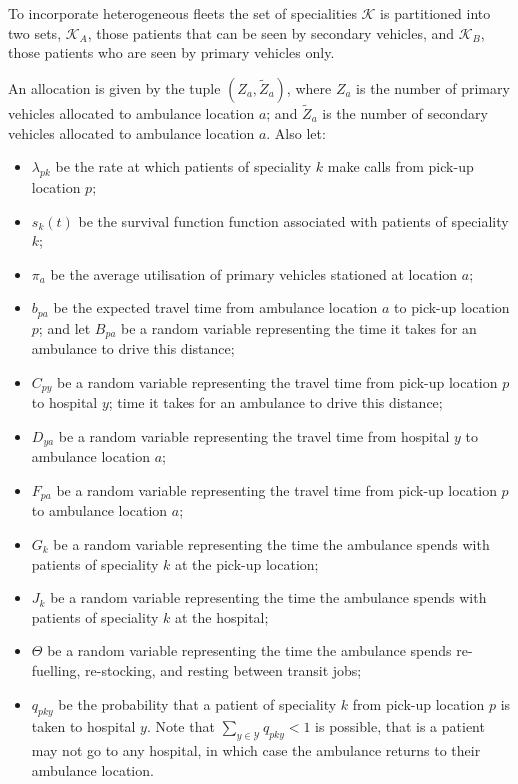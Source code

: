 \documentclass[preprint,12pt]{elsarticle}
\begin{document}
To incorporate heterogeneous fleets the set of specialities $\mathcal{K}$ is
partitioned into two sets, $\mathcal{K}_A$, those patients that can be seen by
secondary vehicles, and $\mathcal{K}_B$, those patients who are seen by
primary vehicles only.

An allocation is given by the tuple $\left(Z_a, \tilde{Z}_a\right)$, where $Z_a$
is the number of primary vehicles allocated to ambulance location $a$; and
$\tilde{Z}_a$ is the number of secondary vehicles allocated to ambulance
location $a$. Also let:

\begin{itemize}
  \item $\lambda_{pk}$ be the rate at which patients of speciality $k$ make
        calls from pick-up location $p$;
  \item $s_k(t)$ be the survival function function associated with patients of
        speciality $k$;
  \item $\pi_a$ be the average utilisation of primary vehicles stationed at
        location $a$;
  \item $b_{pa}$ be the expected travel time from ambulance location $a$ to
        pick-up location $p$; and let $B_{pa}$ be a random variable representing
        the time it takes for an ambulance to drive this distance;
  \item $C_{py}$ be a random variable representing the travel time from pick-up
        location $p$ to hospital $y$;
        time it takes for an ambulance to drive this distance;
  \item $D_{ya}$ be a random variable representing the travel time from hospital
        $y$ to ambulance location $a$;
  \item $F_{pa}$ be a random variable representing the travel time from pick-up
        location $p$ to ambulance location $a$;
  \item $G_k$ be a random variable representing the time the ambulance spends
        with patients of speciality $k$ at the pick-up location;
  \item $J_k$ be a random variable representing the time the ambulance spends
        with patients of speciality $k$ at the hospital;
  \item $\Theta$ be a random variable representing the time the ambulance spends
        re-fuelling, re-stocking, and resting between transit jobs;
  \item $q_{pky}$ be the probability that a patient of speciality $k$ from
        pick-up location $p$ is taken to hospital $y$.
        Note that $\sum_{y \in \mathcal{Y}} q_{pky} < 1$ is possible, that is a
        patient may not go to any hospital, in which case the ambulance returns
        to their ambulance location.
\end{itemize}
\end{document}
